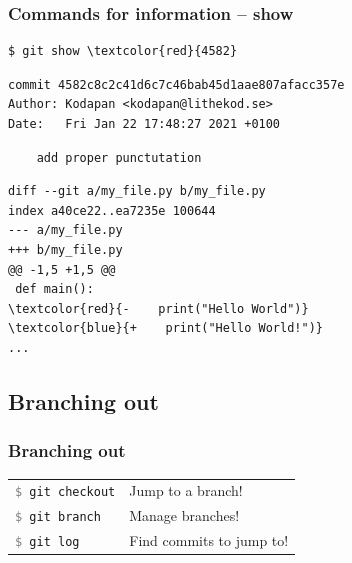 \documentclass{beamer}
\newcommand{\command}[1]{\texttt{\textcolor{gray}{\$} {#1}}}
\begin{document}
\begin{frame}[fragile]
  \frametitle{Commands for information -- show}
\begin{Verbatim}[commandchars=\\\{\}]
$ git show \textcolor{red}{4582}
\end{Verbatim}
\pause{}
\vspace{-2.5ex}
\begin{verbatim}
commit 4582c8c2c41d6c7c46bab45d1aae807afacc357e
Author: Kodapan <kodapan@lithekod.se>
Date:   Fri Jan 22 17:48:27 2021 +0100
\end{verbatim}
\vspace{-3ex}
\begin{verbatim}
    add proper punctutation
\end{verbatim}
\vspace{-2ex}
\begin{Verbatim}[commandchars=\\\{\}]
diff --git a/my_file.py b/my_file.py
index a40ce22..ea7235e 100644
--- a/my_file.py
+++ b/my_file.py
@@ -1,5 +1,5 @@
 def main():
\textcolor{red}{-    print("Hello World")}
\textcolor{blue}{+    print("Hello World!")}
...
\end{Verbatim}
\end{frame}

\subsection{Branching out}

\begin{frame}[fragile]
  \frametitle{Branching out}

  \begin{tabular}{ll}
    \command{git checkout} & Jump to a branch! \\
    \command{git branch} & Manage branches! \\
    \command{git log} & Find commits to jump to! \\
  \end{tabular}

\end{frame}
\end{document}
